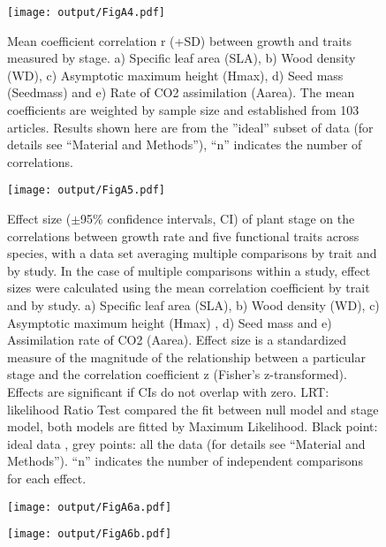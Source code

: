 \documentclass[a4paper,11pt]{article}
\begin{document}
\begin{appendices}
\begin{figure}[h!]
\centering
\texttt{[image: output/FigA4.pdf]}
\caption{Mean coefficient correlation r (+SD) between growth and traits measured by stage.  a) Specific leaf area (SLA), b) Wood density (WD), c) Asymptotic maximum height (Hmax), d) Seed mass (Seedmass) and e) Rate of CO2 assimilation (Aarea). The mean coefficients are weighted by sample size and established from 103 articles. Results shown here are from the ''ideal'' subset of data (for details see ``Material and Methods''), ``n'' indicates the number of correlations.}
\label{fig:figA4}
\end{figure}

\begin{figure}[h!]
\centering
\texttt{[image: output/FigA5.pdf]}
\caption{Effect size ($\pm$95\% confidence intervals, CI) of plant stage on the correlations between growth rate and five functional traits across species, with a data set averaging multiple comparisons by trait and by study. In the case of multiple comparisons within a study, effect sizes were calculated using the mean correlation coefficient by trait and by study. a) Specific leaf area (SLA), b) Wood density (WD), c) Asymptotic maximum height (Hmax) , d) Seed mass and e) Assimilation rate of CO2 (Aarea). Effect size is a standardized measure of the magnitude of the relationship between a particular stage and the correlation coefficient z (Fisher's z-transformed). Effects are significant if CIs do not overlap with zero. LRT: likelihood Ratio Test compared the fit between null model and stage model, both models are fitted by Maximum Likelihood. Black point: ideal data , grey points: all the data (for details see ``Material and Methods''). ``n'' indicates the number of independent comparisons for each effect.}
\label{fig:figA5}
\end{figure}


\begin{figure}[h!]
\centering
\texttt{[image: output/FigA6a.pdf]}
\end{figure}

\begin{figure}[h!]
\centering
\texttt{[image: output/FigA6b.pdf]}
\end{figure}


\end{appendices}
\end{document}
